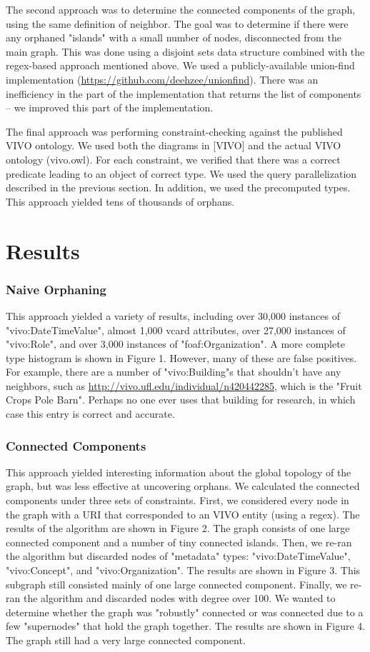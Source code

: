 \documentclass[11pt]{article}
\begin{document}
The second approach was to determine the connected components of the graph, using the same definition of neighbor. The goal was to determine if there were any orphaned "islands" with a small number of nodes, disconnected from the main graph. This was done using a disjoint sets data structure combined with the regex-based approach mentioned above. We used a publicly-available union-find implementation (\url{https://github.com/deehzee/unionfind}). There was an inefficiency in the part of the implementation that returns the list of components -- we improved this part of the implementation.

The final approach was performing constraint-checking against the published VIVO ontology. We used both the diagrams in [VIVO] and the actual VIVO ontology (vivo.owl). For each constraint, we verified that there was a correct predicate leading to an object of correct type. We used the query parallelization described in the previous section. In addition, we used the precomputed types. This approach yielded tens of thousands of orphans.

\section*{Results}
\subsubsection*{Naive Orphaning}
This approach yielded a variety of results, including over 30,000 instances of "vivo:DateTimeValue", almost 1,000 vcard attributes, over 27,000 instances of "vivo:Role", and over 3,000 instances of "foaf:Organization". A more complete type histogram is shown in Figure 1. However, many of these are false positives. For example, there are a number of "vivo:Building"s that shouldn't have any neighbors, such as \url{http://vivo.ufl.edu/individual/n420442285}, which is the "Fruit Crops Pole Barn". Perhaps no one ever uses that building for research, in which case this entry is correct and accurate.

\subsubsection*{Connected Components}
This approach yielded interesting information about the global topology of the graph, but was less effective at uncovering orphans. We calculated the connected components under three sets of constraints. First, we considered every node in the graph with a URI that corresponded to an VIVO entity (using a regex). The results of the algorithm are shown in Figure 2. The graph consists of one large connected component and a number of tiny connected islands. Then, we re-ran the algorithm but discarded nodes of "metadata" types: "vivo:DateTimeValue", "vivo:Concept", and "vivo:Organization". The results are shown in Figure 3. This subgraph still consisted mainly of one large connected component. Finally, we re-ran the algorithm and discarded nodes with degree over 100. We wanted to determine whether the graph was "robustly" connected or was connected due to a few "supernodes" that hold the graph together. The results are shown in Figure 4. The graph still had a very large connected component.
\end{document}
